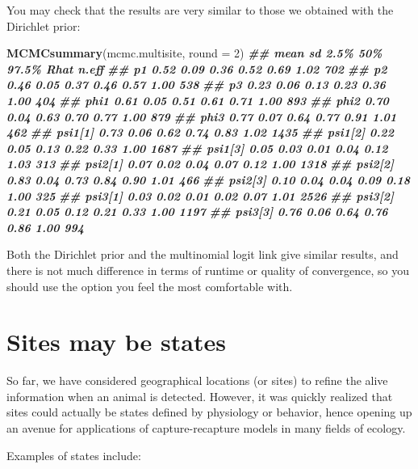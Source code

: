 \documentclass[
  12pt,
]{krantz}
\newenvironment{Shaded}{\begin{snugshade}}{\end{snugshade}}
\newcommand{\AttributeTok}[1]{\textcolor[rgb]{0.13,0.29,0.53}{#1}}
\newcommand{\DecValTok}[1]{\textcolor[rgb]{0.00,0.00,0.81}{#1}}
\newcommand{\DocumentationTok}[1]{\textcolor[rgb]{0.56,0.35,0.01}{\textbf{\textit{#1}}}}
\newcommand{\FunctionTok}[1]{\textcolor[rgb]{0.13,0.29,0.53}{\textbf{#1}}}
\newcommand{\NormalTok}[1]{#1}
\begin{document}
You may check that the results are very similar to those we obtained with the Dirichlet prior:

\begin{Shaded}
\begin{Highlighting}[]
\FunctionTok{MCMCsummary}\NormalTok{(mcmc.multisite, }\AttributeTok{round =} \DecValTok{2}\NormalTok{)}
\DocumentationTok{\#\#         mean   sd 2.5\%  50\% 97.5\% Rhat n.eff}
\DocumentationTok{\#\# p1      0.52 0.09 0.36 0.52  0.69 1.02   702}
\DocumentationTok{\#\# p2      0.46 0.05 0.37 0.46  0.57 1.00   538}
\DocumentationTok{\#\# p3      0.23 0.06 0.13 0.23  0.36 1.00   404}
\DocumentationTok{\#\# phi1    0.61 0.05 0.51 0.61  0.71 1.00   893}
\DocumentationTok{\#\# phi2    0.70 0.04 0.63 0.70  0.77 1.00   879}
\DocumentationTok{\#\# phi3    0.77 0.07 0.64 0.77  0.91 1.01   462}
\DocumentationTok{\#\# psi1[1] 0.73 0.06 0.62 0.74  0.83 1.02  1435}
\DocumentationTok{\#\# psi1[2] 0.22 0.05 0.13 0.22  0.33 1.00  1687}
\DocumentationTok{\#\# psi1[3] 0.05 0.03 0.01 0.04  0.12 1.03   313}
\DocumentationTok{\#\# psi2[1] 0.07 0.02 0.04 0.07  0.12 1.00  1318}
\DocumentationTok{\#\# psi2[2] 0.83 0.04 0.73 0.84  0.90 1.01   466}
\DocumentationTok{\#\# psi2[3] 0.10 0.04 0.04 0.09  0.18 1.00   325}
\DocumentationTok{\#\# psi3[1] 0.03 0.02 0.01 0.02  0.07 1.01  2526}
\DocumentationTok{\#\# psi3[2] 0.21 0.05 0.12 0.21  0.33 1.00  1197}
\DocumentationTok{\#\# psi3[3] 0.76 0.06 0.64 0.76  0.86 1.00   994}
\end{Highlighting}
\end{Shaded}

Both the Dirichlet prior and the multinomial logit link give similar results, and there is not much difference in terms of runtime or quality of convergence, so you should use the option you feel the most comfortable with.

\section{Sites may be states}\label{states}

So far, we have considered geographical locations (or sites) to refine the alive information when an animal is detected. However, it was quickly realized that sites could actually be states defined by physiology or behavior, hence opening up an avenue for applications of capture-recapture models in many fields of ecology.

Examples of states include:
\end{document}
